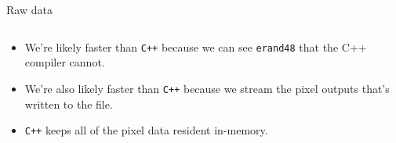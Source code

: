 \documentclass[8pt]{beamer}
\begin{document}
\begin{frame}[fragile]{Raw data}
{\begin{tabular}{lrrrrrrrrrrrrrrrrrrrr}
\hline
\end{tabular}
}
\begin{itemize}
\item We're likely faster than \texttt{C++} because we can see \texttt{erand48} that the C++ compiler cannot.
\item We're also likely faster than \texttt{C++} because we stream the pixel outputs that's written to the file.
\item \texttt{C++} keeps all of the pixel data resident in-memory.
\end{itemize}
\end{frame}
\end{document}
